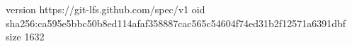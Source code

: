 version https://git-lfs.github.com/spec/v1
oid sha256:ca595e5bbc50b8ed114afaf358887cac565c54604f74ed31b2f12571a6391dbf
size 1632
